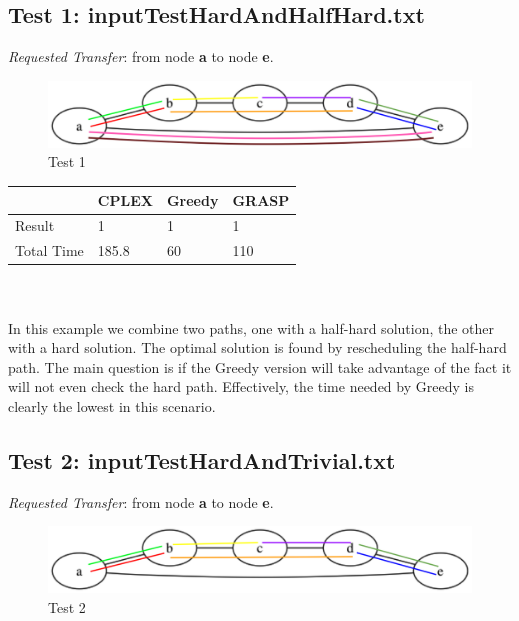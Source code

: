 \documentclass[11pt,a4paper]{article}
\begin{document}
\subsection{Test 1: inputTestHardAndHalfHard.txt}

\textit{Requested Transfer}: from node \textbf{a} to node \textbf{e}.\\

\begin{figure}[H]
  \centering
    \includegraphics[scale=0.7]{inputTestHardAndHalfHard.png}
  \caption{Test 1}
  \label{fig:test1}
\end{figure}

\begin{tabular}{| l | l | l | l |}
\hline
 & CPLEX & Greedy & GRASP \\ \hline
Result & 1 & 1 & 1 \\ \hline
Total Time & 185.8 & 60 & 110 \\ \hline
\end{tabular}\\\\

In this example we combine two paths, one with a half-hard solution, the other with a hard solution. The optimal solution is found by rescheduling the half-hard path. The main question is if the Greedy version will take advantage of the fact it will not even check the hard path. Effectively, the time needed by Greedy is clearly the lowest in this scenario.

\subsection{Test 2: inputTestHardAndTrivial.txt}

\textit{Requested Transfer}: from node \textbf{a} to node \textbf{e}.\\

\begin{figure}[H]
  \centering
    \includegraphics[scale=0.7]{inputTestHardAndTrivial.png}
  \caption{Test 2}
  \label{fig:test2}
\end{figure}
\end{document}
